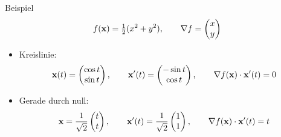 
\begin{frame}{Beispiel}
  \begin{gather*}
    f(\mathbf{x}) = \tfrac12(x^2+y^2),\qquad
    \nabla f =
    \begin{pmatrix}
      x\\y
    \end{pmatrix}
  \end{gather*}
  \begin{itemize}
  \item Kreislinie:
    \begin{gather*}
      \mathbf{x}(t) =
      \begin{pmatrix}
        \cos t\\\sin t
      \end{pmatrix},
      \qquad
      \mathbf{x}'(t) =
      \begin{pmatrix}
        -\sin t\\\cos t
      \end{pmatrix},
      \qquad
      \nabla f(\mathbf{x})\cdot \mathbf{x}'(t) = 0
    \end{gather*}
    \pause
  \item Gerade durch null:
    \begin{gather*}
      \mathbf{x} = \frac1{\sqrt2}
      \begin{pmatrix}
        t\\t
      \end{pmatrix},\qquad
      \mathbf{x}'(t) = \frac1{\sqrt2}
      \begin{pmatrix}
        1\\1
      \end{pmatrix},
      \qquad
      \nabla f(\mathbf{x})\cdot \mathbf{x}'(t) = t
    \end{gather*}
  \end{itemize}
\end{frame}

